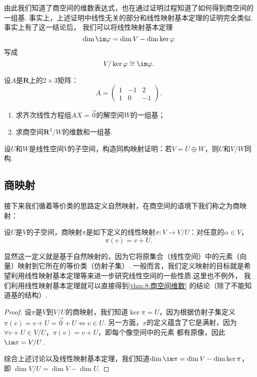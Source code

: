 由此我们知道了商空间的维数表达式，也在通过证明过程知道了如何得到商空间的一组基.
事实上，上述证明中线性无关的部分和线性映射基本定理的证明完全类似.事实上有了这一结论后，
我们可以将线性映射基本定理
\[\dim\im\varphi=\dim V-\dim\ker\varphi\]
写成
\[V/\ker\varphi\cong\im\varphi.\]

\begin{example}
    设$A$是$\mathbf{R}$上的$2\times 3$矩阵：
    $$A=\begin{pmatrix}
        1 & -1 & 2 \\ 1 & 0 & -1
    \end{pmatrix}.$$
    \begin{enumerate}[label=(\arabic*)]
        \item 求齐次线性方程组$AX=\vec{0}$的解空间$W$的一组基；
        \item 求商空间$\mathbf{R}^3/W$的维数和一组基.
    \end{enumerate}
\end{example}
\begin{solution}

\end{solution}

\begin{example}
    设$U$和$W$是线性空间$V$的子空间，构造同构映射证明：若$V=U\oplus W$，则$U$和$V/W$同构.
\end{example}
\begin{solution}

\end{solution}

\subsection{商映射}
接下来我们循着等价类的思路定义自然映射，在商空间的语境下我们称之为商映射：
\begin{definition}
    设$U$是$V$的子空间，商映射$\pi$是如下定义的线性映射$\pi:V\to V/U$：对任意的$\alpha\in V$，
    $$\pi(v)=v+U.$$
\end{definition}
显然这一定义就是基于自然映射的，因为它将原集合（线性空间）中的元素（向量）映射到它所在的等价类（仿射子集）.
一般而言，我们定义映射的目标就是希望利用线性映射基本定理等来进一步研究线性空间的一些性质.这里也不例外，
我们利用线性映射基本定理就可以直接得到\autoref{thm:8:商空间维数} 的结论（除了不能知道基的结构）.

\begin{proof}
    设$\pi$是$V$到$V/U$的商映射，我们知道$\ker\pi=U$，因为根据仿射子集定义$\pi(v)=v+U=\vec{0}+U\iff v\in U$.
    另一方面，$\pi$的定义蕴含了它是满射，因为$\forall v+U\in V/U$，$\pi(v)=v+U$，即每个像空间中的元素
    都有原像，因此$\im\pi=V/U$.

    综合上述讨论以及线性映射基本定理，我们知道$\dim\im\pi=\dim V-\dim\ker\pi$，即
    $\dim V/U=\dim V-\dim U$.
\end{proof}


